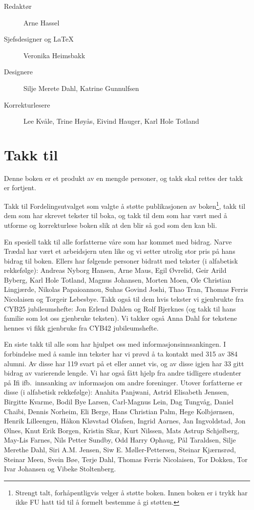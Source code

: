 \begin{description}
	\item[Redaktør] Arne Hassel
	\item[Sjefsdesigner og \LaTeX{}] Veronika Heimsbakk
	\item[Designere] Silje Merete Dahl, Katrine Gunnulfsen
	\item[Korrekturlesere] Lee Kvåle, Trine Høyås, Eivind Hauger, Karl Hole Totland
\end{description}

\section*{Takk til}

Denne boken er et produkt av en mengde personer, og takk skal rettes der takk er fortjent.

Takk til Fordelingsutvalget som valgte å støtte publikasjonen av boken\footnote{Strengt talt, forhåpentligvis velger å støtte boken. Innen boken er i trykk har ikke FU hatt tid til å formelt bestemme å gi støtten.}, takk til dem som har skrevet tekster til boka, og takk til dem som har vært med å utforme og korrekturlese boken slik at den blir så god som den kan bli.

En spesiell takk til alle forfatterne våre som har kommet med bidrag. Narve Trædal har vært et arbeidsjern uten like og vi setter utrolig stor pris på hans bidrag til boken. Ellers har følgende personer bidratt med tekster (i alfabetisk rekkefølge): Andreas Nyborg Hansen, Arne Maus, Egil Øvrelid, Geir Arild Byberg, Karl Hole Totland, Magnus Johansen, Morten Moen, Ole Christian Lingjærde, Nikolas Papaioannou, Suhas Govind Joshi, Thao Tran, Thomas Ferris Nicolaisen og Torgeir Lebesbye. Takk også til dem hvis tekster vi gjenbrukte fra CYB25 jubileumshefte: Jon Erlend Dahlen og Rolf Bjerknes (og takk til hans familie som lot oss gjenbruke teksten). Vi takker også Anna Dahl for tekstene hennes vi fikk gjenbruke fra CYB42 jubileumshefte.

En siste takk til alle som har hjulpet oss med informasjonsinnsankingen. I forbindelse med å samle inn tekster har vi prøvd å ta kontakt med 315 av 384 alumni. Av disse har 119 svart på et eller annet vis, og av disse igjen har 33 gitt bidrag av varierende lengde. Vi har også fått hjelp fra andre tidligere studenter på Ifi ifb.~innsanking av informasjon om andre foreninger. Utover forfatterne er disse (i alfabetisk rekkefølge): Anahita Panjwani, Astrid Elisabeth Jenssen, Birgitte Kvarme, Bodil Bye Larsen, Carl-Magnus Lein, Dag Tungvåg, Daniel Chaibi, Dennis Norheim, Eli Berge, Hans Christian Palm, Hege Kolbjørnsen, Henrik Lilleengen, Håkon Kløvstad Olafsen, Ingrid Aarnes, Jan Ingvoldstad, Jon Ølnes, Knut Erik Borgen, Kristin Skar, Kurt Nilssen, Mats Astrup Schjølberg, May-Lis Farnes, Nils Petter Sundby, Odd Harry Ophaug, Pål Taraldsen, Silje Merethe Dahl, Siri A.M. Jensen, Siw E. Møller-Pettersen, Steinar Kjærnsrød, Steinar Meen, Svein Bøe, Terje Dahl, Thomas Ferris Nicolaisen, Tor Dokken, Tor Ivar Johansen og Vibeke Stoltenberg.

